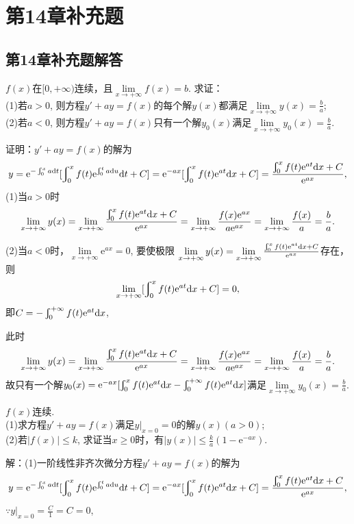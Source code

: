 \documentclass[12pt,UTF8]{ctexart}
\newcommand{\md}[1]{\mathrm d#1}
\newcommand{\me}[0]{\mathrm e}
\begin{document}
\def\thesection{28C}
\section{第14章补充题}
\subsection{第14章补充题解答}
\begin{enumerate}
$f(x)$在$[0,+\infty)$连续，且$\lim\limits_{x\rightarrow+\infty}f(x)=b$. 求证：\\
(1)若$a>0$, 则方程$y'+ay=f(x)$的每个解$y(x)$都满足$\lim\limits_{x\rightarrow+\infty}y(x)=\frac ba$;\\
(2)若$a<0$, 则方程$y'+ay=f(x)$只有一个解$y_0(x)$满足$\lim\limits_{x\rightarrow+\infty}y_0(x)=\frac ba$.

证明：$y'+ay=f(x)$的解为
\[y=\me^{-\varint_0^xa\md t}[\varint\nolimits_0^xf(t)\me^{\varint_0^ta\md u}\md t+C]=\me^{-ax}[\varint\nolimits_0^xf(t)\me^{at}\md x+C]\\
=\frac{\varint\nolimits_0^xf(t)\me^{at}\md x+C}{\me^{ax}},\]
(1)当$a>0$时
\[\lim\limits_{x\rightarrow+\infty}y(x)=\lim\limits_{x\rightarrow+\infty}\frac{\varint\nolimits_0^xf(t)\me^{at}\md x+C}{\me^{ax}}=\lim\limits_{x\rightarrow+\infty}\frac{f(x)\me^{ax}}{a\me^{ax}}=\lim\limits_{x\rightarrow+\infty}\frac{f(x)}a=\frac ba.\]

(2)当$a<0$时，$\lim\limits_{x\rightarrow+\infty}\me^{ax}=0$, 要使极限
$\lim\limits_{x\rightarrow+\infty}y(x)=\lim\limits_{x\rightarrow+\infty}\frac{\varint\nolimits_0^xf(t)\me^{at}\md x+C}{\me^{ax}}$存在，则
\[\lim\limits_{x\rightarrow+\infty}[\varint\nolimits_0^xf(t)\me^{at}\md x+C]=0,\]
即$C=-\varint\nolimits_0^{+\infty}f(t)\me^{at}\md x$,

此时
\[\lim\limits_{x\rightarrow+\infty}y(x)=\lim\limits_{x\rightarrow+\infty}\frac{\varint\nolimits_0^xf(t)\me^{at}\md x+C}{\me^{ax}}=\lim\limits_{x\rightarrow+\infty}\frac{f(x)\me^{ax}}{a\me^{ax}}=\lim\limits_{x\rightarrow+\infty}\frac{f(x)}a=\frac ba.\]
故只有一个解$y_0(x)=\me^{-ax}[\varint\nolimits_0^xf(t)\me^{at}\md x-\varint\nolimits_0^{+\infty}f(t)\me^{at}\md x]$满足$\lim\limits_{x\rightarrow+\infty}y_0(x)=\frac ba$.

$f(x)$连续.\\
(1)求方程$y'+ay=f(x)$满足$y\big|_{x=0}=0$的解$y(x)(a>0)$;\\
(2)若$|f(x)|\leqslant k$, 求证当$x\geqslant0$时，有$|y(x)|\leqslant\frac ka(1-\me^{-ax})$.

解：(1)一阶线性非齐次微分方程$y'+ay=f(x)$的解为
\[y=\me^{-\varint_0^xa\md t}[\varint\nolimits_0^xf(t)\me^{\varint_0^ta\md u}\md t+C]=\me^{-ax}[\varint\nolimits_0^xf(t)\me^{at}\md x+C]\\
=\frac{\varint\nolimits_0^xf(t)\me^{at}\md x+C}{\me^{ax}},\]
$\because y\big|_{x=0}=\frac C1=C=0$,


\end{enumerate}
\end{document}
